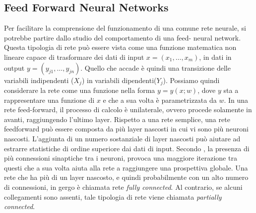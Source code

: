 \subsection{Feed Forward Neural Networks}
Per facilitare la comprensione del funzionamento di una comune rete neurale, 
si potrebbe partire dallo studio del comportamento di una feed- neural 
network. Questa tipologia di rete può essere vista come una funzione matematica 
non lineare capace di trasformare dei dati di input $x=(x_1, \dots, x_m)$, 
in dati in output $y=(y_{j1}, \dots, y_{jn})$. Quello che accade è quindi una transizione 
delle variabili indipendenti ($X_j$) in variabili dipendenti($Y_j$). Possiamo 
quindi considerare la rete come una funzione nella forma $y = y(x;w)$, dove 
$y$ sta a rappresentare una funzione di $x$ e che a sua volta è parametrizzata 
da $w$. In una rete feed-forward, il processo di calcolo è unilaterale, ovvero 
procede solamente in avanti, raggiungendo l'ultimo layer. Rispetto a una 
rete semplice, una rete feedforward può essere composta da più layer nascosti 
in cui vi sono più neuroni nascosti. L'aggiunta di un numero sostanziale 
di layer nascosti può aiutare ad estrarre statistiche di ordine superiore dai 
dati di input. Secondo \cite{04}, la presenza di più connessioni sinaptiche tra i 
neuroni, provoca una maggiore iterazione tra questi che a sua volta aiuta 
alla rete a raggiungere una prospettiva globale. Una rete che ha più di un 
layer nascosto, e quindi probabilmente con un alto numero di connessioni, 
in gergo è chiamata rete \emph{fully connected}. Al contrario, se alcuni collegamenti 
sono assenti, tale tipologia di rete viene chiamata \emph{partially connected}.

